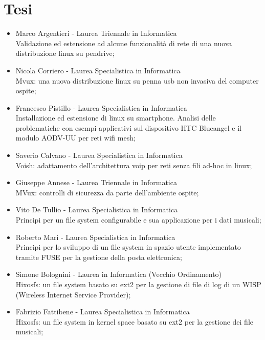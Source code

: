 \documentclass[a4paper,12pt]{article}
\renewcommand{\aa }{\`{a} }
\begin{document}
\section*{Tesi}
\begin{itemize}
\item Marco Argentieri - Laurea Triennale in Informatica\\Validazione ed estensione ad alcune funzionalit\aa di rete di una nuova distribuzione linux su pendrive;
\item Nicola Corriero - Laurea Specialistica in Informatica\\Mvux: una nuova distribuzione linux su penna usb non invasiva del computer ospite;
\item Francesco Pistillo - Laurea Specialistica in Informatica\\Installazione ed estensione di linux su smartphone. Analisi delle problematiche con esempi applicativi sul dispositivo HTC Blueangel e il modulo AODV-UU per reti wifi mesh;
\item Saverio Calvano - Laurea Specialistica in Informatica\\Voish: adattamento dell'architettura voip per reti senza fili ad-hoc in linux;
\item Giuseppe Annese - Laurea Triennale in Informatica\\MVux: controlli di sicurezza da parte dell'ambiente ospite;
\item Vito De Tullio - Laurea Specialistica in Informatica\\Principi per un file system configurabile e sua applicazione per i dati musicali;
\item Roberto Mari - Laurea Specialistica in Informatica\\Principi per lo sviluppo di un file system in spazio utente implementato tramite FUSE per la gestione della posta elettronica;
\item Simone Bolognini - Laurea in Informatica (Vecchio Ordinamento)\\Hixosfs: un file system basato su ext2 per la gestione di file di log di un WISP (Wireless Internet Service Provider);
\item Fabrizio Fattibene - Laurea Specialistica in Informatica\\Hixosfs: un file system in kernel space basato su ext2 per la gestione dei file musicali;
\end{itemize}
\end{document}
